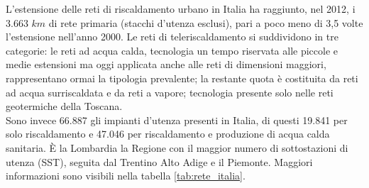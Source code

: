\documentclass[laurea,oneside,11pt]{USiena_tesiLM}
\begin{document}
L'estensione delle reti di riscaldamento urbano in Italia ha raggiunto, nel 2012, i 3.663 $km$ di rete primaria (stacchi d'utenza esclusi), pari a poco meno di 3,5 volte l'estensione nell'anno 2000.
Le reti di teleriscaldamento si suddividono in tre categorie: le reti ad acqua calda, tecnologia un tempo riservata alle piccole e medie estensioni ma oggi applicata anche alle reti di dimensioni maggiori, rappresentano ormai la tipologia prevalente; la restante quota è costituita da reti ad acqua surriscaldata e da reti a vapore; tecnologia presente solo nelle reti geotermiche della Toscana.\\

Sono invece 66.887 gli impianti d'utenza presenti in Italia, di questi 19.841 per solo riscaldamento e 47.046 per riscaldamento e
produzione di acqua calda sanitaria. \`E la Lombardia la Regione con il maggior numero di sottostazioni di utenza (SST), seguita dal Trentino Alto Adige e il Piemonte. Maggiori informazioni sono visibili nella tabella \ref{tab:rete_italia}.
\end{document}
